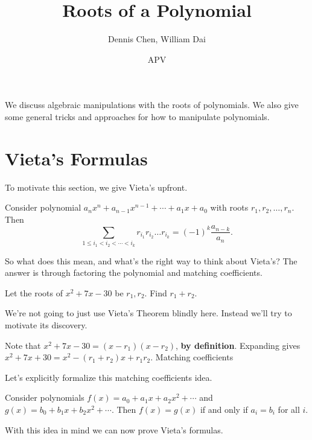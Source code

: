 \documentclass{article}
\title{Roots of a Polynomial}
\author{Dennis Chen, William Dai}
\date{APV}
\begin{document}
\maketitle

We discuss algebraic manipulations with the roots of polynomials. We also give some general tricks and approaches for how to manipulate polynomials.

\section{Vieta's Formulas}
To motivate this section, we give Vieta's upfront.

\begin{theo}
Consider polynomial $a_nx^n+a_{n-1}x^{n-1}+\cdots+a_{1}x+a_0$ with roots $r_1,r_2,\ldots,r_n.$ Then
\[\sum\limits_{1\leq i_1<i_2<\cdots<i_k}r_{i_1}r_{i_2}\ldots r_{i_k}=(-1)^k\frac{a_{n-k}}{a_n}.\]
\end{theo}

So what does this mean, and what's the right way to think about Vieta's? The answer is through factoring the polynomial and matching coefficients.

\begin{exam}[Quadratic]
Let the roots of $x^2+7x-30$ be $r_1,r_2.$ Find $r_1+r_2.$
\end{exam}

We're not going to just use Vieta's Theorem blindly here. Instead we'll try to motivate its discovery.

\begin{sol}
Note that $x^2+7x-30=(x-r_1)(x-r_2)$, \textbf{by definition}. Expanding gives $x^2+7x+30=x^2-(r_1+r_2)x+r_1r_2.$ Matching coefficients
\end{sol}

Let's explicitly formalize this matching coefficients idea.

\begin{theo}
Consider polynomials $f(x)=a_0+a_1x+a_2x^2+\cdots$ and $g(x)=b_0+b_1x+b_2x^2+\cdots.$ Then $f(x)=g(x)$ if and only if $a_i=b_i$ for all $i.$\footnotemark
\end{theo}


With this idea in mind we can now prove Vieta's formulas.
\end{document}
